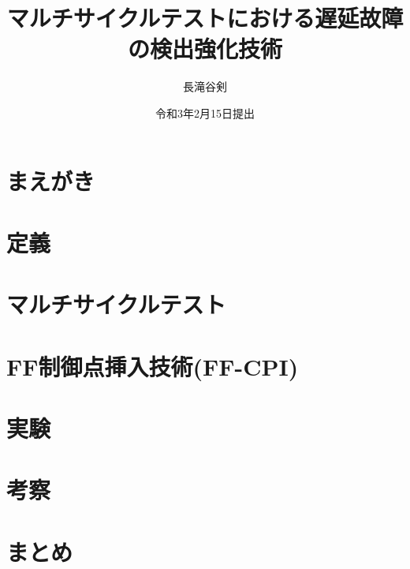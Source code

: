 

\newenvironment{indention}[1]{\par
\addtolength{\leftskip}{#1}
\begingroup}{\endgroup\par}

\title{マルチサイクルテストにおける遅延故障の検出強化技術}
\author{長滝谷剣}
\date{令和3年2月15日提出}


\maketitle
\tableofcontents
\cleardoublepage
{}

\chapter{まえがき}


\chapter{定義}


\chapter{マルチサイクルテスト}


\chapter{FF制御点挿入技術(FF-CPI)}


\chapter{実験}


\chapter{考察}


\chapter{まとめ}



